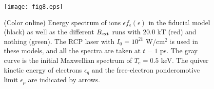 \begin{figure}
\texttt{[image: fig8.eps]}%
\caption{
(Color online)
Energy spectrum of ions $\epsilon f_{\epsilon} (\epsilon)$ in the
fiducial model (black) as well as the
different $B_{\rm ext}$ runs with 20.0 kT (red) and nothing (green).
The RCP laser with $I_0 = 10^{21}$ W/cm$^2$ is used in these models, and
all the spectra are taken at $t = 1$ ps.
The gray curve is the initial Maxwellian spectrum of $T_e = 0.5$ keV.
The quiver kinetic energy of electrons $\epsilon_q$ and the
free-electron ponderomotive limit $\epsilon_p$ are indicated by arrows. 
\label{fig:8}}
\end{figure}
